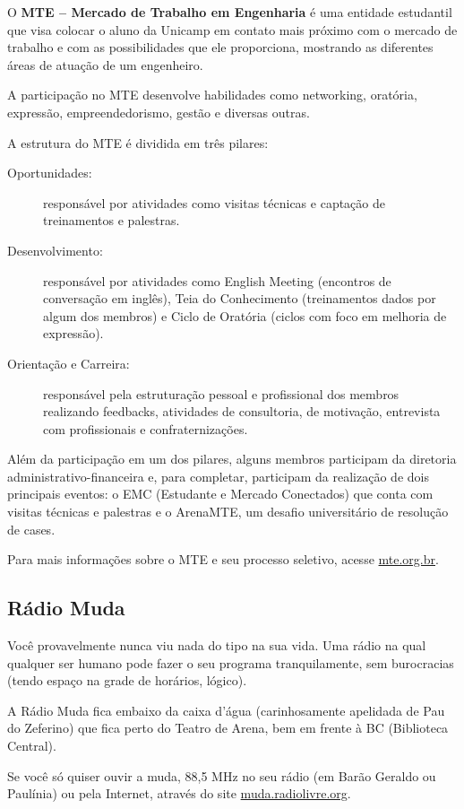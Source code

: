 O \textbf{MTE -- Mercado de Trabalho em Engenharia} é uma entidade estudantil que visa colocar o aluno da Unicamp em
contato mais próximo com o mercado de trabalho e com as possibilidades que ele
proporciona, mostrando as diferentes áreas de atuação de um engenheiro.

A participação no MTE desenvolve habilidades como networking, oratória, expressão, empreendedorismo, gestão e diversas outras.

A estrutura do MTE é dividida em três pilares:

\begin{description}
\item[Oportunidades:] responsável por atividades como visitas técnicas e captação de treinamentos e palestras.
\item[Desenvolvimento:] responsável por atividades como English Meeting (encontros de conversação em inglês), Teia do Conhecimento (treinamentos dados por algum dos membros) e Ciclo de Oratória (ciclos com foco em melhoria de expressão).
\item[Orientação e Carreira:] responsável pela estruturação pessoal e profissional dos membros realizando feedbacks, atividades de consultoria, de motivação, entrevista com profissionais e confraternizações.
\end{description}

Além da participação em um dos pilares, alguns membros participam da diretoria administrativo-financeira e, para completar, participam da realização de dois principais eventos: o EMC (Estudante e Mercado Conectados) que conta com visitas técnicas e palestras e o ArenaMTE, um desafio universitário de resolução de cases.

Para mais informações sobre o MTE e seu processo seletivo, acesse
\url{mte.org.br}.

\subsection{Rádio Muda}

Você provavelmente nunca viu nada do tipo na sua vida. Uma rádio na qual
qualquer ser humano pode fazer o seu programa tranquilamente, sem burocracias
(tendo espaço na grade de horários, lógico).

A Rádio Muda fica embaixo da caixa d'água (carinhosamente apelidada de Pau do
Zeferino) que fica perto do Teatro de Arena, bem em frente à BC (Biblioteca
Central).

Se você só quiser ouvir a muda, 88,5 MHz no seu rádio (em Barão Geraldo ou
Paulínia) ou pela Internet, através do site \url{muda.radiolivre.org}.

